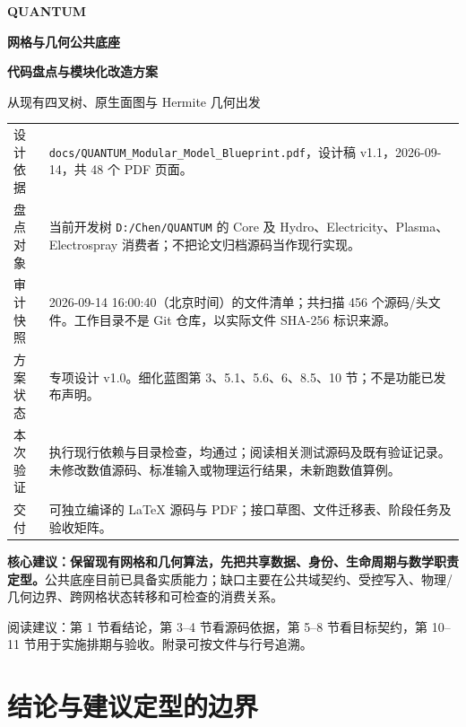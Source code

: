 \documentclass[UTF8,a4paper,11pt,fontset=fandol]{ctexart}
\newcommand{\code}[1]{\nolinkurl{#1}}
\newcommand{\decision}[1]{\par\medskip\noindent\colorbox{pale}{\parbox{\dimexpr\linewidth-2\fboxsep}{\strut #1\strut}}\par\medskip}
\begin{document}
\hypersetup{pageanchor=false}
\begin{titlepage}
\vspace*{14mm}
{\Large\color{accent}\bfseries QUANTUM \par}
\vspace{7mm}
{\Huge\bfseries\color{ink}网格与几何公共底座\par}
\vspace{5mm}
{\LARGE\bfseries 代码盘点与模块化改造方案\par}
\vspace{8mm}
{\large 从现有四叉树、原生面图与 Hermite 几何出发\par}
\vspace{13mm}
\noindent\begin{tabularx}{\textwidth}{@{}P{.2\textwidth}X@{}}
\toprule
设计依据 & \code{docs/QUANTUM_Modular_Model_Blueprint.pdf}，设计稿 v1.1，2026-09-14，共 48 个 PDF 页面。\\
盘点对象 & 当前开发树 \code{D:/Chen/QUANTUM} 的 Core 及 Hydro、Electricity、Plasma、Electrospray 消费者；不把论文归档源码当作现行实现。\\
审计快照 & 2026-09-14 16:00:40（北京时间）的文件清单；共扫描 456 个源码/头文件。工作目录不是 Git 仓库，以实际文件 SHA-256 标识来源。\\
方案状态 & 专项设计 v1.0。细化蓝图第 3、5.1、5.6、6、8.5、10 节；不是功能已发布声明。\\
本次验证 & 执行现行依赖与目录检查，均通过；阅读相关测试源码及既有验证记录。未修改数值源码、标准输入或物理运行结果，未新跑数值算例。\\
交付 & 可独立编译的 LaTeX 源码与 PDF；接口草图、文件迁移表、阶段任务及验收矩阵。\\
\bottomrule
\end{tabularx}
\vspace{9mm}
\decision{\textbf{核心建议：保留现有网格和几何算法，先把共享数据、身份、生命周期与数学职责定型。}公共底座目前已具备实质能力；缺口主要在公共域契约、受控写入、物理/几何边界、跨网格状态转移和可检查的消费关系。}
\vfill
{\small\color{muted}阅读建议：第 1 节看结论，第 3--4 节看源码依据，第 5--8 节看目标契约，第 10--11 节用于实施排期与验收。附录可按文件与行号追溯。}
\end{titlepage}
\hypersetup{pageanchor=true}
{\small\setlength{\parskip}{0pt}\tableofcontents}
\clearpage

\section{结论与建议定型的边界}
\end{document}
